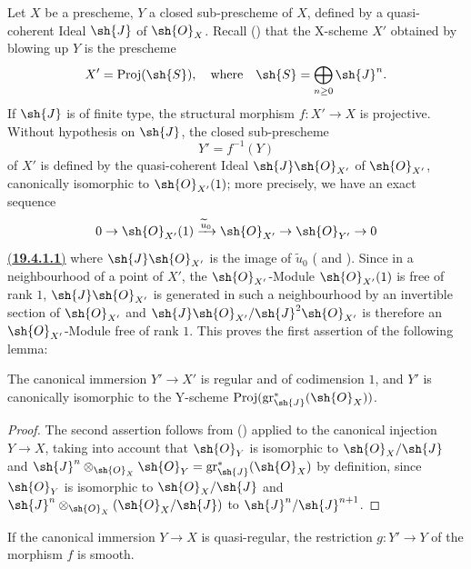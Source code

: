 \begin{env}[19.4.1]
\label{IV.19.4.1}
Let $X$ be a prescheme, $Y$ a closed sub-prescheme of $X$, defined by a quasi-coherent Ideal $\sh{J}$ of $\sh{O}_X$.
Recall () that the X-scheme $X'$ obtained by blowing up $Y$ is the prescheme
\[
  X'=\operatorname{Proj}(\sh{S}), \quad \text{where}\quad \sh{S}=\bigoplus_{n\geq 0}\sh{J}^n.
\]
If $\sh{J}$ is of finite type, the structural morphism $f:X'\to X$ is projective.
Without hypothesis on $\sh{J}$, the closed sub-prescheme
\[
  Y'=f^{-1}(Y)
\]
of $X'$ is defined by the quasi-coherent Ideal $\sh{J}\sh{O}_{X'}$ of $\sh{O}_{X'}$, canonically isomorphic to $\sh{O}_{X'}(1)$; more precisely, we have an exact sequence
\[
  0\to\sh{O}_{X'}(1)\xrightarrow{\widetilde{u}_0}\sh{O}_{X'}\to\sh{O}_{Y'}\to 0
\]
\hyperref[IV.19.4.1.1]{(\textbf{19.4.1.1})}
\label{IV.19.4.1.1}
where $\sh{J}\sh{O}_{X'}$ is the image of $\widetilde{u}_0$ ( and ).
Since in a neighbourhood of a point of $X'$, the $\sh{O}_{X'}$-Module $\sh{O}_{X'}(1)$ is free of rank $1$, $\sh{J}\sh{O}_{X'}$ is generated in such a neighbourhood by an invertible section of $\sh{O}_{X'}$ and $\sh{J}\sh{O}_{X'}/\sh{J}^2\sh{O}_{X'}$ is therefore an $\sh{O}_{X'}$-Module free of rank $1$.
This proves the first assertion of the following lemma:
\end{env}

\begin{lemma}[19.4.2]
\label{IV.19.4.2}
The canonical immersion $Y'\to X'$ is regular and of codimension $1$, and $Y'$ is canonically isomorphic to the Y-scheme $\operatorname{Proj}(\operatorname{gr}_\sh{J}^*(\sh{O}_X))$.
\end{lemma}

\begin{proof}
The second assertion follows from () applied to the canonical injection $Y\to X$, taking into account that $\sh{O}_Y$ is isomorphic to $\sh{O}_X/\sh{J}$ and $\sh{J}^n\otimes_{\sh{O}_X}\sh{O}_Y=\operatorname{gr}_\sh{J}^*(\sh{O}_X)$ by definition, since $\sh{O}_Y$ is isomorphic to $\sh{O}_X/\sh{J}$ and $\sh{J}^n\otimes_{\sh{O}_X}(\sh{O}_X/\sh{J})$ to $\sh{J}^n/\sh{J}^{n+1}$.
\end{proof}

\begin{corollary}[19.4.3]
\label{IV.19.4.3}
If the canonical immersion $Y\to X$ is quasi-regular, the restriction $g:Y'\to Y$ of the morphism $f$ is smooth.
\end{corollary}

